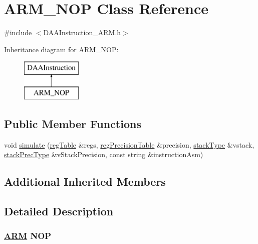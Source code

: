 \hypertarget{classARM__NOP}{}\section{A\+R\+M\+\_\+\+N\+OP Class Reference}
\label{classARM__NOP}


{\ttfamily \#include $<$D\+A\+A\+Instruction\+\_\+\+A\+R\+M.\+h$>$}

Inheritance diagram for A\+R\+M\+\_\+\+N\+OP\+:\begin{figure}[H]
\begin{center}
\leavevmode
\includegraphics[height=2.000000cm]{classARM__NOP}
\end{center}
\end{figure}
\subsection*{Public Member Functions}
\begin{DoxyCompactItemize}
\item 
void \hyperlink{classARM__NOP_a9a78eb5aae1d48b00841d9581591840a}{simulate} (\hyperlink{DAAInstruction_8h_af0fae93a861de9cf37988d5673cac523}{reg\+Table} \&regs, \hyperlink{DAAInstruction_8h_a0e8cae02815a5f8adc750122d790b455}{reg\+Precision\+Table} \&precision, \hyperlink{DAAInstruction_8h_a1b0e70ac1a04f06c8132055ed01f589f}{stack\+Type} \&vstack, \hyperlink{DAAInstruction_8h_ac5cb793e9dac3fa9693da78b7e29ab30}{stack\+Prec\+Type} \&v\+Stack\+Precision, const string \&instruction\+Asm)
\end{DoxyCompactItemize}
\subsection*{Additional Inherited Members}


\subsection{Detailed Description}


 \subsubsection*{\hyperlink{classARM}{A\+RM} N\+OP }

